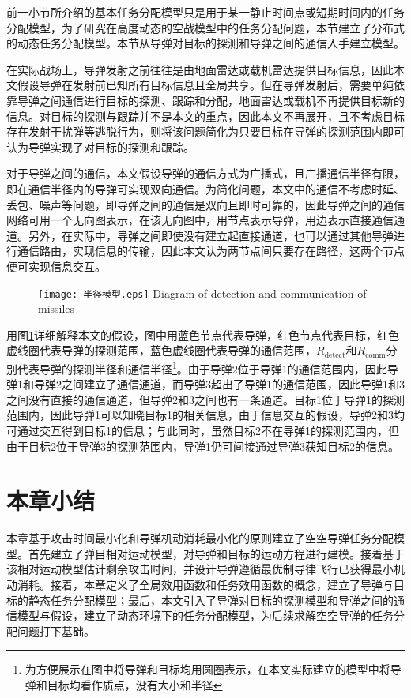 前一小节所介绍的基本任务分配模型只是用于某一静止时间点或短期时间内的任务分配模型，为了研究在高度动态的空战模型中的任务分配问题，本节建立了分布式的动态任务分配模型。本节从导弹对目标的探测和导弹之间的通信入手建立模型。

在实际战场上，导弹发射之前往往是由地面雷达或载机雷达提供目标信息，因此本文假设导弹在发射前已知所有目标信息且全局共享。但在导弹发射后，需要单纯依靠导弹之间通信进行目标的探测、跟踪和分配，地面雷达或载机不再提供目标新的信息。对目标的探测与跟踪并不是本文的重点，因此本文不再展开，且不考虑目标存在发射干扰弹等逃脱行为，则将该问题简化为只要目标在导弹的探测范围内即可认为导弹实现了对目标的探测和跟踪。

对于导弹之间的通信，本文假设导弹的通信方式为广播式，且广播通信半径有限，即在通信半径内的导弹可实现双向通信。为简化问题，本文中的通信不考虑时延、丢包、噪声等问题，即导弹之间的通信是双向且即时可靠的，因此导弹之间的通信网络可用一个无向图表示，在该无向图中，用节点表示导弹，用边表示直接通信通道。另外，在实际中，导弹之间即使没有建立起直接通道，也可以通过其他导弹进行通信路由，实现信息的传输，因此本文认为两节点间只要存在路径，这两个节点便可实现信息交互。

\begin{figure}[!htp]
  \centering
  \texttt{[image: 半径模型.eps]}
    {Diagram of detection and communication of missiles}
  \label{fig:detect_and_com}
\end{figure}

用图\ref{fig:detect_and_com}详细解释本文的假设，图中用蓝色节点代表导弹，红色节点代表目标，红色虚线圈代表导弹的探测范围，蓝色虚线圈代表导弹的通信范围，$R_{\text{detect}}$和$R_{\text{comm}}$分别代表导弹的探测半径和通信半径\footnote{为方便展示在图中将导弹和目标均用圆圈表示，在本文实际建立的模型中将导弹和目标均看作质点，没有大小和半径}。由于导弹2位于导弹1的通信范围内，因此导弹1和导弹2之间建立了通信通道，而导弹3超出了导弹1的通信范围，因此导弹1和3之间没有直接的通信通道，但导弹2和3之间也有一条通道。目标1位于导弹1的探测范围内，因此导弹1可以知晓目标1的相关信息，由于信息交互的假设，导弹2和3均可通过交互得到目标1的信息；与此同时，虽然目标2不在导弹1的探测范围内，但由于目标2位于导弹3的探测范围内，导弹1仍可间接通过导弹3获知目标2的信息。


\section{本章小结}
\label{model:sec:conclusion}
本章基于攻击时间最小化和导弹机动消耗最小化的原则建立了空空导弹任务分配模型。首先建立了弹目相对运动模型，对导弹和目标的运动方程进行建模。接着基于该相对运动模型估计剩余攻击时间，并设计导弹遵循最优制导律飞行已获得最小机动消耗。接着，本章定义了全局效用函数和任务效用函数的概念，建立了导弹与目标的静态任务分配模型；最后，本文引入了导弹对目标的探测模型和导弹之间的通信模型与假设，建立了动态环境下的任务分配模型，为后续求解空空导弹的任务分配问题打下基础。














